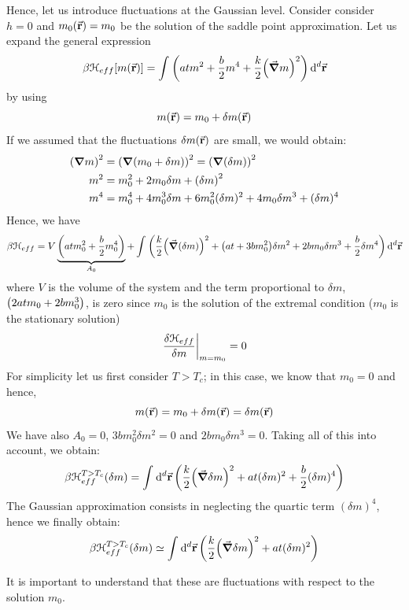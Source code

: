 \documentclass[../main/main.tex]{subfiles}
\begin{document}
Hence, let us introduce fluctuations at the Gaussian level. Consider consider \( h=0 \) and \( m_0 (\va{r})= m_0 \) be the solution of the saddle point approximation. Let us expand the general expression
\begin{equation*}
  \beta \mathcal{H}_{eff}  [m (\va{r})] = \int_{}^{}  \qty( a t m^2 + \frac{b}{2} m^4 + \frac{k}{2} \qty(\va{\grad } m)^2 ) \dd[d]{\va{r}}
\end{equation*}
by using
\begin{equation*}
  m(\va{r}) = m_0 + \delta m(\va{r})
\end{equation*}
If we assumed that the fluctuations \(  \delta m(\va{r})\) are small, we would obtain:
\begin{subequations}
\begin{align*}
   \qty(\grad m)^2 &= \qty(\grad \qty(m_0 + \delta m) )^2 = \qty(\grad \qty(\delta m) )^2  \\
     m^2 &= m_0^2 + 2 m_0 \delta m + \qty(\delta m)^2 \\
     m^4 &= m_0^4 + 4 m_0^3 \delta m + 6 m_0^2 (\delta m)^2 + 4 m_0 \delta m^3 + (\delta m)^4
\end{align*}
\end{subequations}
Hence, we have
\begin{equation}
  \beta \mathcal{H}_{eff} = V \underbrace{ \qty(a t m_0^2 + \frac{b}{2} m_0^4) }_{A_0}
  + \int_{}^{} \qty(\frac{k}{2}\qty( \va{\grad } (\delta m))^2 + \qty(a t + 3 b m_0^2)\delta  m^2 + 2 b m_0 \delta m^3 + \frac{b}{2} \delta m^4 )\dd[d]{\va{r}}
\end{equation}
where \( V \) is the volume of the system and the term proportional to \( \delta m \),  \( \qty( 2 a t m_0  +  2b m_0^3 )  \), is zero since \( m_0 \) is the solution of the extremal condition (\( m_0 \) is the stationary solution)
\begin{equation*}
  \eval{\frac{\delta \mathcal{H}_{eff}}{\delta m}}_{m=m_0} = 0
\end{equation*}
For simplicity let us first consider \( T>T_c \); in this case, we know that \( m_0 = 0 \) and hence,
\begin{equation*}
   m (\va{r}) = m_0 + \delta m(\va{r}) = \delta m (\va{r})
\end{equation*}
We have also \( A_0 =0 \),  \( 3bm_0^2 \delta m^2 = 0 \) and \( 2 b m_0 \delta m^3 = 0 \). Taking all of this into account, we obtain:
\begin{equation*}
  \beta \mathcal{H}_{eff}^{T>T_c} (\delta m)= \int_{}^{} \dd[d]{\va{r}} \qty(\frac{k}{2} \qty(\va{\grad }\delta m)^2 + a t (\delta m)^2 + \frac{b}{2} (\delta m)^4 )
\end{equation*}
The Gaussian approximation consists in neglecting the quartic term \( (\delta m)^4 \), hence we finally obtain:
\begin{equation}
    \beta \mathcal{H}_{eff}^{T>T_c} (\delta m) \simeq  \int_{}^{} \dd[d]{\va{r}} \qty(\frac{k}{2} \qty( \va{\grad } \delta m)^2 + a t (\delta m)^2 )
\end{equation}
\begin{remark}
It is important to understand that these are fluctuations with respect to the solution \( m_0 \).
\end{remark}
\end{document}
